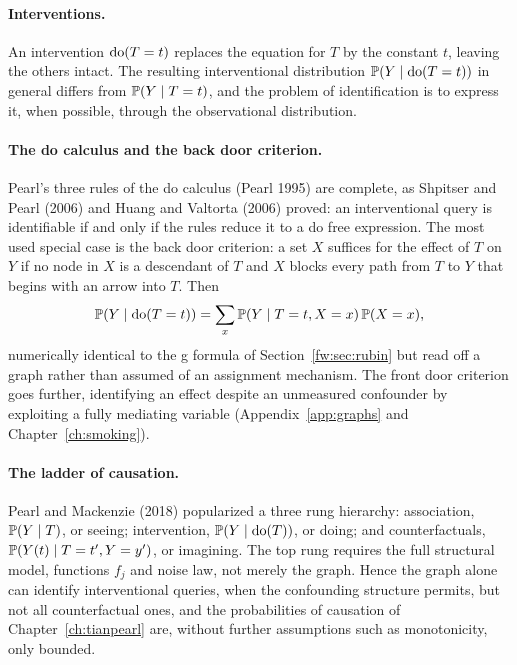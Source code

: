\paragraph{Interventions.} An intervention $\mathrm{do}(T=t)$ replaces the equation for $T$ by the constant $t$, leaving the others intact. The resulting interventional distribution $\mathbb{P}(Y \mid \mathrm{do}(T=t))$ in general differs from $\mathbb{P}(Y \mid T=t)$, and the problem of identification is to express it, when possible, through the observational distribution.

\paragraph{The do calculus and the back door criterion.} Pearl's three rules of the do calculus (Pearl 1995) are complete, as Shpitser and Pearl (2006) and Huang and Valtorta (2006) proved: an interventional query is identifiable if and only if the rules reduce it to a do free expression. The most used special case is the back door criterion: a set $X$ suffices for the effect of $T$ on $Y$ if no node in $X$ is a descendant of $T$ and $X$ blocks every path from $T$ to $Y$ that begins with an arrow into $T$. Then
\begin{equation}\label{fw:eq:backdoor}
\mathbb{P}(Y \mid \mathrm{do}(T=t)) = \sum_{x} \mathbb{P}(Y \mid T=t, X=x)\,\mathbb{P}(X=x),
\end{equation}
numerically identical to the g formula of Section~\ref{fw:sec:rubin} but read off a graph rather than assumed of an assignment mechanism. The front door criterion goes further, identifying an effect despite an unmeasured confounder by exploiting a fully mediating variable (Appendix~\ref{app:graphs} and Chapter~\ref{ch:smoking}).

\paragraph{The ladder of causation.} Pearl and Mackenzie (2018) popularized a three rung hierarchy: association, $\mathbb{P}(Y\mid T)$, or seeing; intervention, $\mathbb{P}(Y\mid \mathrm{do}(T))$, or doing; and counterfactuals, $\mathbb{P}(Y(t) \mid T=t', Y=y')$, or imagining. The top rung requires the full structural model, functions $f_j$ and noise law, not merely the graph. Hence the graph alone can identify interventional queries, when the confounding structure permits, but not all counterfactual ones, and the probabilities of causation of Chapter~\ref{ch:tianpearl} are, without further assumptions such as monotonicity, only bounded.

